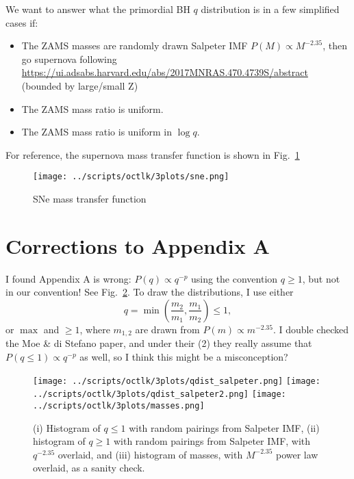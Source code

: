 \documentclass[11pt,
        usenames, %
        dvipsnames %
    ]{article}
\newcommand*{\p}[1]{\left(#1\right)}
\begin{document}
We want to answer what the primordial BH $q$ distribution is in a few simplified
cases if:
\begin{itemize}
    \item The ZAMS masses are randomly drawn Salpeter IMF $P(M) \propto
        M^{-2.35}$, then go supernova following
        \url{https://ui.adsabs.harvard.edu/abs/2017MNRAS.470.4739S/abstract}
        (bounded by large/small Z)

    \item The ZAMS mass ratio is uniform.

    \item The ZAMS mass ratio is uniform in $\log q$.
\end{itemize}

For reference, the supernova mass transfer function is shown in
Fig.~\ref{fig:sne}
\begin{figure}[t]
    \centering
    \texttt{[image: ../scripts/octlk/3plots/sne.png]}
    \caption{SNe mass transfer function}\label{fig:sne}
\end{figure}

\section{Corrections to Appendix A}

I found Appendix A is wrong: $P(q) \propto q^{-p}$ using the convention $q \geq
1$, but not in our convention! See Fig.~\ref{fig:1}. To draw the distributions,
I use either
\begin{equation}
    q = \min\p{\frac{m_2}{m_1}, \frac{m_1}{m_2}} \leq 1,
\end{equation}
or $\max$ and $\geq 1$, where $m_{1,2}$ are drawn from $P(m) \propto m^{-2.35}$.
I double checked the Moe \& di Stefano paper, and under their (2) they really
assume that $P(q \leq 1) \propto q^{-p}$ as well, so I think this might be a
misconception?
\begin{figure}
    \centering
    \texttt{[image: ../scripts/octlk/3plots/qdist\_salpeter.png]}
    \texttt{[image: ../scripts/octlk/3plots/qdist\_salpeter2.png]}
    \texttt{[image: ../scripts/octlk/3plots/masses.png]}
    \caption{(i) Histogram of $q \leq 1$ with random pairings from Salpeter IMF,
    (ii) histogram of $q \geq 1$ with random pairings from Salpeter IMF, with $q
    ^{ -2.35}$ overlaid, and (iii) histogram of masses, with $M^{-2.35}$ power
    law overlaid, as a sanity check.}\label{fig:1}
\end{figure}
\end{document}
